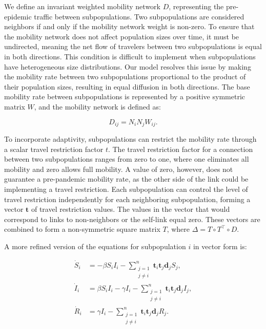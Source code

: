 We define an invariant weighted mobility network \( D \), representing the pre-epidemic traffic between subpopulations. Two subpopulations are considered neighbors if and only if the mobility network weight is non-zero. To ensure that the mobility network does not affect population sizes over time, it must be undirected, meaning the net flow of travelers between two subpopulations is equal in both directions. This condition is difficult to implement when subpopulations have heterogeneous size distributions. Our model resolves this issue by making the mobility rate between two subpopulations proportional to the product of their population sizes, resulting in equal diffusion in both directions. The base mobility rate between subpopulations is represented by a positive symmetric matrix \( W \), and the mobility network is defined as:

\begin{equation}
D_{ij} = N_i N_j W_{ij}.
\end{equation}

To incorporate adaptivity, subpopulations can restrict the mobility rate through a scalar travel restriction factor \(t\). The travel restriction factor for a connection between two subpopulations ranges from zero to one, where one eliminates all mobility and zero allows full mobility. A value of zero, however, does not guarantee a pre-pandemic mobility rate, as the other side of the link could be implementing a travel restriction. Each subpopulation can control the level of travel restriction independently for each neighboring subpopulation, forming a vector \( \mathbf{t} \) of travel restriction values. The values in the vector that would correspond to links to non-neighbors or the self-link equal zero. These vectors are combined to form a non-symmetric square matrix \( T \), where \( \Delta = T \circ T^\top \circ D \).

A more refined version of the equations for subpopulation \( i \) in vector form is:

\begin{align}
    \dot{S}_{i} &= -\beta S_{i} I_{i} - \sum_{\substack{j=1 \\ j \neq i}}^n \mathbf{t}_i \mathbf{t}_j \mathbf{d}_j S_j, \\
    \dot{I}_{i} &= \beta S_{i} I_{i} - \gamma I_{i} - \sum_{\substack{j=1 \\ j \neq i}}^n \mathbf{t}_i \mathbf{t}_j \mathbf{d}_j I_j, \\
    \dot{R}_{i} &= \gamma I_{i} - \sum_{\substack{j=1 \\ j \neq i}}^n \mathbf{t}_i \mathbf{t}_j \mathbf{d}_j R_j.
\end{align}

